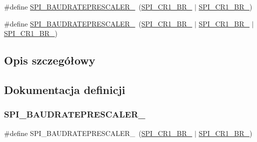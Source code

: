 \begin{DoxyCompactItemize}
\#define \hyperlink{group___s_p_i___baud_rate___prescaler_ga939117a1ff97fbf4f1340cbb3141fb29}{S\+P\+I\+\_\+\+B\+A\+U\+D\+R\+A\+T\+E\+P\+R\+E\+S\+C\+A\+L\+E\+R\+\_}~(\hyperlink{group___peripheral___registers___bits___definition_ga28b823d564e9d90150bcc6744b4ed622}{S\+P\+I\+\_\+\+C\+R1\+\_\+\+B\+R\+\_} $\vert$ \hyperlink{group___peripheral___registers___bits___definition_ga45e93d18c8966964ed1926d5ca87ef46}{S\+P\+I\+\_\+\+C\+R1\+\_\+\+B\+R\+\_})
\item 
\#define \hyperlink{group___s_p_i___baud_rate___prescaler_ga4debd0953aeeb470eae28a42aa8289c2}{S\+P\+I\+\_\+\+B\+A\+U\+D\+R\+A\+T\+E\+P\+R\+E\+S\+C\+A\+L\+E\+R\+\_}~(\hyperlink{group___peripheral___registers___bits___definition_ga28b823d564e9d90150bcc6744b4ed622}{S\+P\+I\+\_\+\+C\+R1\+\_\+\+B\+R\+\_} $\vert$ \hyperlink{group___peripheral___registers___bits___definition_ga45e93d18c8966964ed1926d5ca87ef46}{S\+P\+I\+\_\+\+C\+R1\+\_\+\+B\+R\+\_} $\vert$ \hyperlink{group___peripheral___registers___bits___definition_gaa364b123cf797044094cc229330ce321}{S\+P\+I\+\_\+\+C\+R1\+\_\+\+B\+R\+\_})
\end{DoxyCompactItemize}


\subsection{Opis szczegółowy}


\subsection{Dokumentacja definicji}
\mbox{\label{group___s_p_i___baud_rate___prescaler_ga939117a1ff97fbf4f1340cbb3141fb29}} 
\subsubsection{\texorpdfstring{S\+P\+I\+\_\+\+B\+A\+U\+D\+R\+A\+T\+E\+P\+R\+E\+S\+C\+A\+L\+E\+R\+\_}{SPI\_BAUDRATEPRESCALER\_128}}
{\footnotesize\ttfamily \#define S\+P\+I\+\_\+\+B\+A\+U\+D\+R\+A\+T\+E\+P\+R\+E\+S\+C\+A\+L\+E\+R\+\_~(\hyperlink{group___peripheral___registers___bits___definition_ga28b823d564e9d90150bcc6744b4ed622}{S\+P\+I\+\_\+\+C\+R1\+\_\+\+B\+R\+\_} $\vert$ \hyperlink{group___peripheral___registers___bits___definition_ga45e93d18c8966964ed1926d5ca87ef46}{S\+P\+I\+\_\+\+C\+R1\+\_\+\+B\+R\+\_})}



